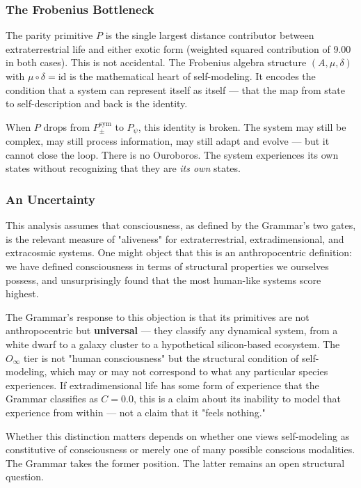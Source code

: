 \documentclass[12pt,a4paper]{article}
\begin{document}
\subsubsection{The Frobenius Bottleneck}

The parity primitive $P$ is the single largest distance contributor between extraterrestrial life and either exotic form (weighted squared contribution of 9.00 in both cases). This is not accidental. The Frobenius algebra structure $(A, \mu, \delta)$ with $\mu \circ \delta = \text{id}$ is the mathematical heart of self-modeling. It encodes the condition that a system can represent itself as itself --- that the map from state to self-description and back is the identity.

When $P$ drops from $P_{\pm}^{\text{sym}}$ to $P_{\psi}$, this identity is broken. The system may still be complex, may still process information, may still adapt and evolve --- but it cannot close the loop. There is no Ouroboros. The system experiences its own states without recognizing that they are \emph{its own} states.

\subsubsection{An Uncertainty}

This analysis assumes that consciousness, as defined by the Grammar's two gates, is the relevant measure of "aliveness" for extraterrestrial, extradimensional, and extracosmic systems. One might object that this is an anthropocentric definition: we have defined consciousness in terms of structural properties we ourselves possess, and unsurprisingly found that the most human-like systems score highest.

The Grammar's response to this objection is that its primitives are not anthropocentric but \textbf{universal} --- they classify any dynamical system, from a white dwarf to a galaxy cluster to a hypothetical silicon-based ecosystem. The $O_{\infty}$ tier is not "human consciousness" but the structural condition of self-modeling, which may or may not correspond to what any particular species experiences. If extradimensional life has some form of experience that the Grammar classifies as $C = 0.0$, this is a claim about its inability to model that experience from within --- not a claim that it "feels nothing."

Whether this distinction matters depends on whether one views self-modeling as constitutive of consciousness or merely one of many possible conscious modalities. The Grammar takes the former position. The latter remains an open structural question.
\end{document}
